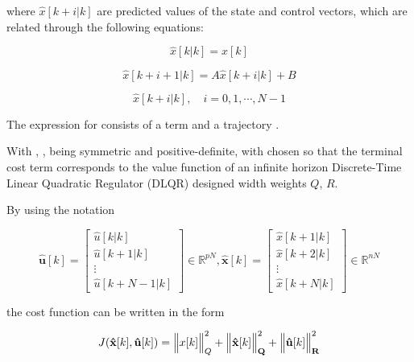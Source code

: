 \noindent
where $\hat{x}[k+i|k]$ are predicted values of the state and control vectors, which are 
related through the following equations:

\noindent
\begin{equation}
    \hat{x}[k|k] = x[k]
\end{equation}

\noindent
\begin{equation}
    \hat{x}[k + i + 1|k] = A \hat{x}[k+i|k] + B
\end{equation}

\noindent
\begin{equation}
    \hat{x}[k + i|k], \quad i =  0, 1, \dotsm, N-1
\end{equation}


The expression for  consists of a  term and a trajectory . 

With , ,  being symmetric and positive-definite, 
with  chosen so that the terminal cost  term corresponds 
to the value function of an infinite horizon Discrete-Time Linear Quadratic Regulator (DLQR) designed width
weights $Q$, $R$.

By using the notation

\begin{equation}
    \mathbf{\hat{u}}[k] = 
    \left[
        \begin{matrix}
            \hat{u}[k | k] \\		
            \hat{u}[k + 1 | k] \\		
            \vdots \\
            \hat{u}[k + N-1 | k]
        \end{matrix}
    \right]
    \in \mathbb{R}^{pN},
    \mathbf{\hat{x}}[k] = 
    \left[
        \begin{matrix}
            \hat{x}[k + 1| k] \\ 
            \hat{x}[k + 2| k] \\ 
            \vdots \\
            \hat{x}[k + N | k]
        \end{matrix}
    \right]
    \in \mathbb{R}^{nN}
\end{equation}

\noindent
the cost function can be written in the form

\noindent
\begin{equation}
    J(\mathbf{\hat{x}}[k], \mathbf{\hat{u}}[k]) = \Big\Vert x[k] \Big\Vert^2_{Q} + 
    \Big\Vert \mathbf{\hat{x}}[k] \Big\Vert^2_{\mathbf{Q}} + \Big\Vert \mathbf{\hat{u}}[k] \Big\Vert^2_{\mathbf{R}}
\end{equation}

